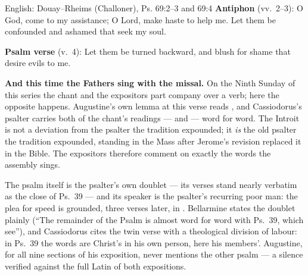 \begin{namedtranslation}{English: Douay--Rheims (Challoner), Ps. 69:2--3 and 69:4}
\textbf{Antiphon} (vv.~2--3): O God, come to my assistance; O Lord, make haste
to help me. Let them be confounded and ashamed that seek my soul.

\textbf{Psalm verse} (v.~4): Let them be turned backward, and blush for shame
that desire evils to me.
\end{namedtranslation}


\textbf{And this time the Fathers sing with the missal.} On the Ninth Sunday
of this series the chant and the expositors part company over a verb; here
the opposite happens. Augustine's own lemma at
this verse reads , and Cassiodorus's psalter carries both of the chant's readings ---
 and  --- word for word. The Introit is not
a deviation from the psalter the tradition expounded; it \textit{is} the old
psalter the tradition expounded, standing in the Mass after Jerome's revision
replaced it in the Bible. The expositors therefore comment on exactly the
words the assembly sings.

The psalm itself is the psalter's own doublet --- its verses stand nearly
verbatim as the close of Ps.~39 --- and its speaker is the psalter's
recurring poor man: the plea for speed is grounded, three verses later, in
. Bellarmine states the doublet plainly
(``The remainder of the Psalm is almost word for word with Ps.~39, which
see''), and Cassiodorus cites the twin verse with a theological division of
labour: in Ps.~39 the words are Christ's in his own person, here his
members'. Augustine, for all nine sections of his exposition, never mentions
the other psalm --- a silence verified against the full Latin of both
expositions.


